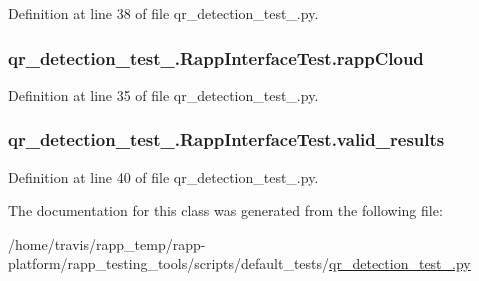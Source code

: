 Definition at line 38 of file qr\-\_\-detection\-\_\-test\-\_.\-py.

\hypertarget{classqr__detection__test__1_1_1RappInterfaceTest_ae6d2ab2d088b79dc57a3d615dc832159}{
\subsubsection[{rapp\-Cloud}]{\setlength{\rightskip}{0pt plus 5cm}qr\-\_\-detection\-\_\-test\-\_.\-Rapp\-Interface\-Test.\-rapp\-Cloud}}\label{classqr__detection__test__1_1_1RappInterfaceTest_ae6d2ab2d088b79dc57a3d615dc832159}


Definition at line 35 of file qr\-\_\-detection\-\_\-test\-\_.\-py.

\hypertarget{classqr__detection__test__1_1_1RappInterfaceTest_ad00b6f3d01566426e34b35c33449e128}{
\subsubsection[{valid\-\_\-results}]{\setlength{\rightskip}{0pt plus 5cm}qr\-\_\-detection\-\_\-test\-\_.\-Rapp\-Interface\-Test.\-valid\-\_\-results}}\label{classqr__detection__test__1_1_1RappInterfaceTest_ad00b6f3d01566426e34b35c33449e128}


Definition at line 40 of file qr\-\_\-detection\-\_\-test\-\_.\-py.



The documentation for this class was generated from the following file\-:\begin{DoxyCompactItemize}
\item 
/home/travis/rapp\-\_\-temp/rapp-\/platform/rapp\-\_\-testing\-\_\-tools/scripts/default\-\_\-tests/\hyperlink{qr__detection__test__1_8py}{qr\-\_\-detection\-\_\-test\-\_.\-py}\end{DoxyCompactItemize}
